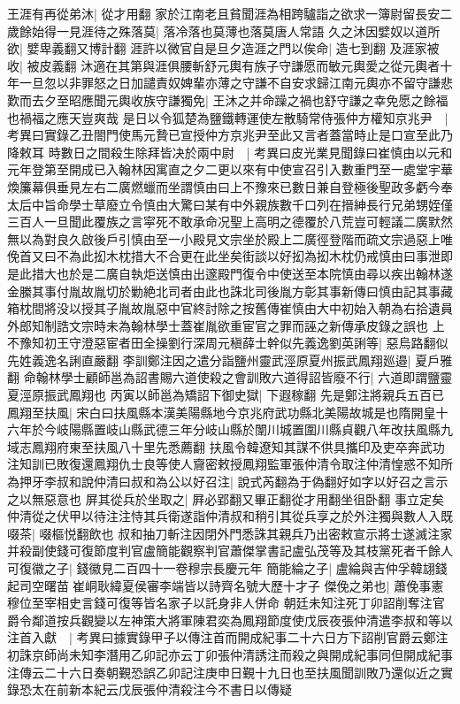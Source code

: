王涯有再從弟沐|{
	從才用翻}
家於江南老且貧聞涯為相跨驢詣之欲求一簿尉留長安二歲餘始得一見涯待之殊落莫|{
	落冷落也莫薄也落莫唐人常語}
久之沐因嬖奴以道所欲|{
	嬖卑義翻又博計翻}
涯許以微官自是旦夕造涯之門以俟命|{
	造七到翻}
及涯家被收|{
	被皮義翻}
沐適在其第與涯俱腰斬舒元輿有族子守謙愿而敏元輿愛之從元輿者十年一旦忽以非罪怒之日加譴責奴婢輩亦薄之守謙不自安求歸江南元輿亦不留守謙悲歎而去夕至昭應聞元輿收族守謙獨免|{
	王沐之并命躁之禍也舒守謙之幸免愿之餘福也禍福之應天豈爽哉}
是日以令狐楚為鹽鐵轉運使左散騎常侍張仲方權知京兆尹　|{
	考異曰實錄乙丑閤門使馬元贄已宣授仲方京兆尹至此又言者蓋當時止是口宣至此乃降敕耳}
時數日之間殺生除拜皆决於兩中尉　|{
	考異曰皮光業見聞錄曰崔慎由以元和元年登第至開成已入翰林因寓直之夕二更以來有中使宣召引入數重門至一處堂宇華煥簾幕俱垂見左右二廣燃蠟而坐謂慎由曰上不豫來已數日兼自登極後聖政多虧今奉太后中旨命學士草廢立令慎由大驚曰某有中外親族數千口列在搢紳長行兄弟甥姪僅三百人一旦聞此覆族之言寜死不敢承命况聖上高明之德覆於八荒豈可輕議二廣默然無以為對良久啟後戶引慎由至一小殿見文宗坐於殿上二廣徑登階而疏文宗過惡上唯俛首又曰不為此抝木枕措大不合更在此坐矣街談以好抝為抝木枕仍戒慎由曰事泄即是此措大也於是二廣自執炬送慎由出邃殿門復令中使送至本院慎由尋以疾出翰林遂金縢其事付胤故胤切於勦絶北司者由此也誅北司後胤方彰其事新傳曰慎由記其事藏箱枕間將没以授其子胤故胤惡中官終討除之按舊傳崔慎由大中初始入朝為右拾遺員外郎知制誥文宗時未為翰林學士蓋崔胤欲重宦官之罪而誣之新傳承皮錄之誤也}
上不豫知初王守澄惡宦者田全操劉行深周元稹薛士幹似先義逸劉英誗等|{
	惡烏路翻似先姓義逸名誗直嚴翻}
李訓鄭注因之遣分詣鹽州靈武涇原夏州振武鳳翔廵邉|{
	夏戶雅翻}
命翰林學士顧師邕為詔書賜六道使殺之會訓敗六道得詔皆廢不行|{
	六道即謂鹽靈夏涇原振武鳳翔也}
丙寅以師邕為矯詔下御史獄|{
	下遐稼翻}
先是鄭注將親兵五百已鳳翔至扶風|{
	宋白曰扶風縣本漢美陽縣地今京兆府武功縣北美陽故城是也隋開皇十六年於今岐陽縣置岐山縣武德三年分岐山縣於闈川城置圍川縣貞觀八年改扶風縣九域志鳳翔府東至扶風八十里先悉薦翻}
扶風令韓遼知其謀不供具攜印及吏卒奔武功注知訓已敗復還鳳翔仇士良等使人齎密敕授鳳翔監軍張仲清令取注仲清惶惑不知所為押牙李叔和說仲清曰叔和為公以好召注|{
	說式芮翻為于偽翻好如字以好召之言示之以無惡意也}
屏其從兵於坐取之|{
	屛必郢翻又畢正翻從才用翻坐徂卧翻}
事立定矣仲清從之伏甲以待注注恃其兵衛遂詣仲清叔和稍引其從兵享之於外注獨與數人入既啜茶|{
	啜樞悦翻飲也}
叔和抽刀斬注因閉外門悉誅其親兵乃出密敕宣示將士遂滅注家并殺副使錢可復節度判官盧簡能觀察判官蕭傑掌書記盧弘茂等及其枝黨死者千餘人可復徽之子|{
	錢徽見二百四十一卷穆宗長慶元年}
簡能綸之子|{
	盧綸與吉仲孚韓翃錢起司空曙苗崔峒耿緯夏侯審李端皆以詩齊名號大歷十才子}
傑俛之弟也|{
	蕭俛事憲穆位至宰相史言錢可復等皆名家子以託身非人併命}
朝廷未知注死丁卯詔削奪注官爵令鄰道按兵觀變以左神策大將軍陳君奕為鳳翔節度使戊辰夜張仲清遣李叔和等以注首入獻　|{
	考異曰據實錄甲子以傳注首而開成紀事二十六日方下詔削官爵云鄭注初誅京師尚未知李潛用乙卯記亦云丁卯張仲清誘注而殺之與開成紀事同但開成紀事注傳云二十六日奏朝覲恐誤乙卯記注庚申日覲十九日也至扶風聞訓敗乃還似近之實錄恐太在前新本紀云戊辰張仲清殺注今不書日以傳疑}
